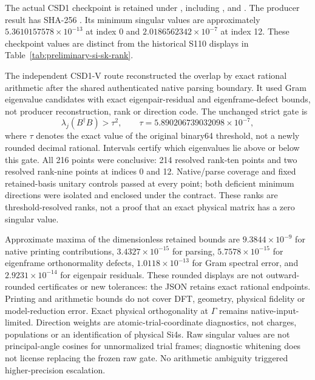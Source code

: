 The actual CSD1 checkpoint is retained under
, including
,  and
. The producer result has SHA-256
.
Its minimum singular values are approximately
$5.3610157578\times10^{-13}$ at index 0 and
$2.0186562342\times10^{-7}$ at index 12. These checkpoint values are distinct
from the historical S110 displays in Table~\ref{tab:preliminary-si-sk-rank}.

The independent CSD1-V route reconstructed the overlap by exact rational
arithmetic after the shared authenticated native parsing boundary. It used
Gram eigenvalue candidates with exact eigenpair-residual and eigenframe-defect
bounds, not producer reconstruction, rank or direction code. The unchanged
strict gate is
\begin{equation}
  \lambda_j(B^{\dagger}B)>\tau^2,
  \qquad \tau=5.890206739032098\times10^{-7},
  \label{eq:appendix-m-csd1v-gate}
\end{equation}
where $\tau$ denotes the exact value of the original binary64 threshold, not
a newly rounded decimal rational. Intervals certify which eigenvalues lie
above or below this gate. All 216 points were conclusive: 214 resolved rank-ten
points and two resolved rank-nine points at indices 0 and 12. Native/parse
coverage and fixed retained-basis unitary controls passed at every point;
both deficient minimum directions were isolated and enclosed under the
contract. These ranks are threshold-resolved ranks, not a proof that an exact
physical matrix has a zero singular value.

Approximate maxima of the dimensionless retained bounds are
$9.3844\times10^{-9}$ for native printing contributions,
$3.4327\times10^{-15}$ for parsing,
$5.7578\times10^{-15}$ for eigenframe orthonormality defects,
$1.0118\times10^{-13}$ for Gram spectral error, and
$2.9231\times10^{-14}$ for eigenpair residuals. These rounded displays are not
outward-rounded certificates or new tolerances: the JSON retains exact rational
endpoints. Printing and arithmetic bounds do not cover DFT, geometry, physical
fidelity or model-reduction error. Exact physical orthogonality at $\Gamma$
remains native-input-limited. Direction weights are atomic-trial-coordinate
diagnostics, not charges, populations or an identification of physical Si4s.
Raw singular values are not principal-angle cosines for unnormalized trial
frames; diagnostic whitening does not license replacing the frozen raw gate.
No arithmetic ambiguity triggered higher-precision escalation.

